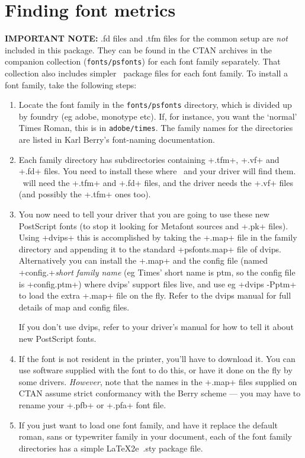 \documentclass{article}
\begin{document}
\section{Finding font metrics}
\textbf{IMPORTANT NOTE:} .fd files and .tfm files for the common setup are
\emph{not} included in this package. They can be found in the CTAN
archives in the companion collection (\texttt{fonts/psfonts}) for each
font family separately.  That collection also includes simpler \LaTeXe\ 
package files for each font family. To install a font family, take the
following steps:
\begin{enumerate}
\item Locate the font family in the \texttt{fonts/psfonts} directory,
  which is divided up by foundry (eg adobe, monotype etc). If, for
  instance, you want the `normal' Times Roman, this is in
  \texttt{adobe/times}. The family names for the directories are
  listed in Karl Berry's font-naming documentation.
\item Each family directory has subdirectories containing +.tfm+,
  +.vf+ and +.fd+ files. You need to install these where \LaTeXe\ and
  your driver will   find them. \LaTeXe\ will need the +.tfm+ and
  +.fd+ files, and the driver needs the +.vf+ files (and possibly the
  +.tfm+ ones too).
\item You now need to tell your driver that you are going to use these
  new PostScript fonts (to stop it looking for Metafont sources and
  +.pk+ files). Using +dvips+ this is accomplished by taking the +.map+
  file in the family directory and appending it to the standard
  +psfonts.map+ file of dvips. Alternatively you can install the
  +.map+ and the config file (named +config.+\emph{short family name} (eg
  Times' short name is ptm, so the config file is +config.ptm+) where
  dvips' support files live, and use eg +dvips -Pptm+ to load the
  extra +.map+ file on the fly. Refer to the dvips manual for full
  details of map and config files.

  If you don't use dvips, refer to your driver's manual for how to
  tell it about new PostScript fonts.
\item If the font is not resident in the printer, you'll have to
  download it. You can use software supplied with the font to do this,
  or have it done on the fly by some drivers. \emph{However}, note
  that the names in the +.map+ files supplied on CTAN assume strict
  conformancy with the Berry scheme --- you may have to rename your
  +.pfb+ or +.pfa+ font file.
\item If you just want to load one font family, and have it replace
  the default roman, sans or typewriter family in your document, each
  of the font family directories has a simple \LaTeX2e\ .sty package
  file.
\end{enumerate}
\end{document}
